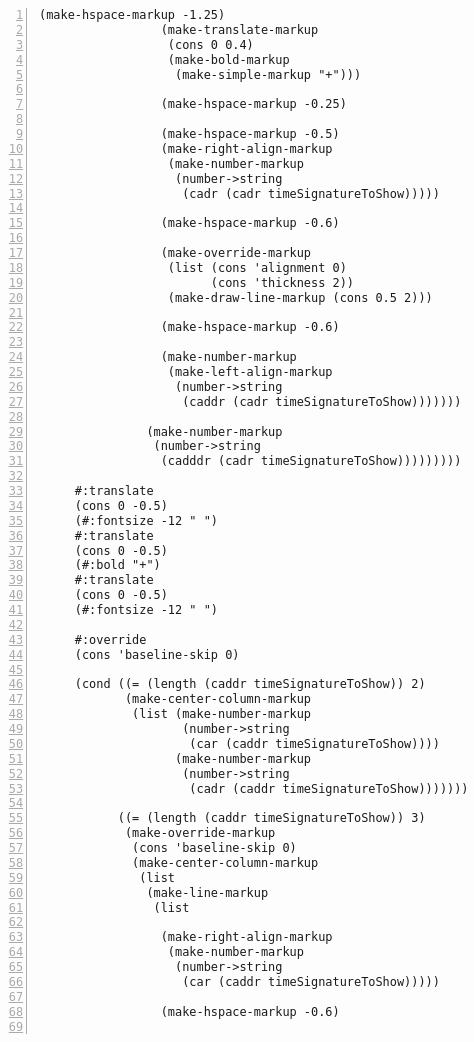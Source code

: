 \begin{Verbatim}[numbers=left,xleftmargin=5mm]
                 (make-hspace-markup -1.25)
                 (make-translate-markup
                  (cons 0 0.4)
                  (make-bold-markup
                   (make-simple-markup "+")))

                 (make-hspace-markup -0.25)

                 (make-hspace-markup -0.5)
                 (make-right-align-markup
                  (make-number-markup
                   (number->string
                    (cadr (cadr timeSignatureToShow)))))

                 (make-hspace-markup -0.6)

                 (make-override-markup
                  (list (cons 'alignment 0)
                        (cons 'thickness 2))
                  (make-draw-line-markup (cons 0.5 2)))

                 (make-hspace-markup -0.6)

                 (make-number-markup
                  (make-left-align-markup
                   (number->string
                    (caddr (cadr timeSignatureToShow)))))))

               (make-number-markup
                (number->string
                 (cadddr (cadr timeSignatureToShow)))))))))

     #:translate
     (cons 0 -0.5)
     (#:fontsize -12 " ")
     #:translate
     (cons 0 -0.5)
     (#:bold "+")
     #:translate
     (cons 0 -0.5)
     (#:fontsize -12 " ")

     #:override
     (cons 'baseline-skip 0)

     (cond ((= (length (caddr timeSignatureToShow)) 2)
            (make-center-column-markup
             (list (make-number-markup
                    (number->string
                     (car (caddr timeSignatureToShow))))
                   (make-number-markup
                    (number->string
                     (cadr (caddr timeSignatureToShow)))))))

           ((= (length (caddr timeSignatureToShow)) 3)
            (make-override-markup
             (cons 'baseline-skip 0)
             (make-center-column-markup
              (list
               (make-line-markup
                (list

                 (make-right-align-markup
                  (make-number-markup
                   (number->string
                    (car (caddr timeSignatureToShow)))))

                 (make-hspace-markup -0.6)


\end{Verbatim}
